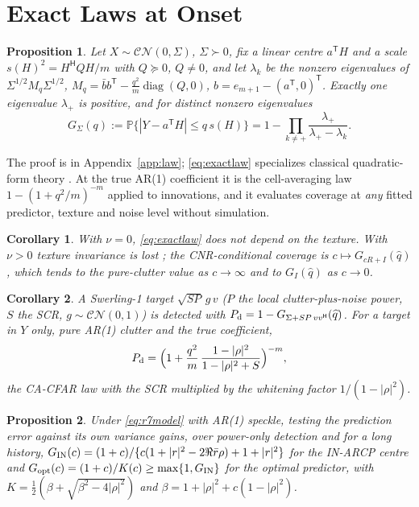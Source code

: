 \documentclass[journal]{IEEEtran}
\newtheorem{proposition}{Proposition}
\newtheorem{corollary}{Corollary}
\newcommand{\PP}{\mathbb{P}}
\begin{document}
\section{Exact Laws at Onset}\label{sec:onsetlaws}
\begin{proposition}\label{prop:law}
Let $X\sim\mathcal{CN}(0,\Sigma)$, $\Sigma\succ0$, fix a linear centre $a^{\mathsf T}H$ and a scale $s(H)^2=H^{\mathsf H}QH/m$ with $Q\succeq0$, $Q\ne0$, and let $\lambda_k$ be the nonzero eigenvalues of $\Sigma^{1/2}M_q\Sigma^{1/2}$, $M_q=\bar bb^{\mathsf T}-\frac{q^2}{m}\operatorname{diag}(Q,0)$, $b=e_{m+1}-(a^{\mathsf T},0)^{\mathsf T}$. Exactly one eigenvalue $\lambda_+$ is positive, and for distinct nonzero eigenvalues
\begin{equation}
G_\Sigma(q):=\PP\{|Y-a^{\mathsf T}H|\le q\,s(H)\}=1-\prod_{k\ne+}\frac{\lambda_+}{\lambda_+-\lambda_k}.
\label{eq:exactlaw}
\end{equation}
\end{proposition}
The proof is in Appendix~\ref{app:law}; \eqref{eq:exactlaw} specializes classical quadratic-form theory \cite{imhof1961,alnaffouri2016}. At the true AR(1) coefficient it is the cell-averaging law $1-(1+q^2/m)^{-m}$ \cite{finn1968,gandhi1988} applied to innovations, and it evaluates coverage at \emph{any} fitted predictor, texture and noise level without simulation.
\begin{corollary}\label{cor:texture}
With $\nu=0$, \eqref{eq:exactlaw} does not depend on the texture. With $\nu>0$ texture invariance is lost \cite{gini1997,watts1987,sangston2012}; the CNR-conditional coverage is $c\mapsto G_{cR+I}(\widehat q)$, which tends to the pure-clutter value as $c\to\infty$ and to $G_I(\widehat q)$ as $c\to0$.
\end{corollary}
\begin{corollary}\label{cor:detect}
A Swerling-1 target $\sqrt{SP}\,g\,v$ ($P$ the local clutter-plus-noise power, $S$ the SCR, $g\sim\mathcal{CN}(0,1)$) is detected with $P_{\rm d}=1-G_{\Sigma+SP\,vv^{\mathsf H}}(\widehat q)$. For a target in $Y$ only, pure AR(1) clutter and the true coefficient,
\begin{equation}
P_{\rm d}=\Big(1+\frac{q^2}{m}\,\frac{1-|\rho|^2}{1-|\rho|^2+S}\Big)^{-m},
\label{eq:pdclosed}
\end{equation}
the CA-CFAR law with the SCR multiplied by the whitening factor $1/(1-|\rho|^2)$.
\end{corollary}
\begin{proposition}\label{prop:gain}
Under \eqref{eq:r7model} with AR(1) speckle, testing the prediction error against its own variance gains, over power-only detection and for a long history, $G_{\rm IN}(c)=(1+c)/\{c(1+|r|^2-2\Re\bar r\rho)+1+|r|^2\}$ for the IN-ARCP centre and $G_{\rm opt}(c)=(1+c)/K(c)\ge\max\{1,G_{\rm IN}\}$ for the optimal predictor, with $K=\frac12(\beta+\sqrt{\beta^2-4|\rho|^2})$ and $\beta=1+|\rho|^2+c(1-|\rho|^2)$.
\end{proposition}
\end{document}
